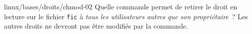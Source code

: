 \begin{question}{linux/bases/droits/chmod-02}
  Quelle commande permet de retirer le droit en lecture sur le fichier
  {\tt fic} à {\em tous les utilisateurs autres que son
    propriétaire}~? Les autres droits ne devront pas être modifiés par
  la commande.
  \begin{reponses}
    \lastchoices
  \end{reponses}
\end{question}
